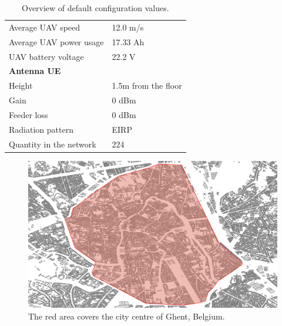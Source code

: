 \begin{table}[!htb]
\begin{tabular}[t]{m{8cm} m{7cm}}
        \hspace{3mm}  Average UAV speed                   & 12.0 m/s \\
        \hspace{3mm}  Average UAV power usage             & 17.33 Ah    \\
        \hspace{3mm}  UAV battery voltage                 & 22.2 V \\
        \hline
        \multicolumn{2}{l}{\textbf{Antenna \acs{UE}}} \\
        \hline 
        \hspace{3mm} Height                     & 1.5m from the floor       \\ 
        \hspace{3mm} Gain                      & 0 dBm   \\ 
        \hspace{3mm} Feeder loss               & 0 dBm   \\ 
        \hspace{3mm} Radiation pattern         & \acs{EIRP}  \\
        \hspace{3mm} Quantity in the network                & 224  \\
        \toprule
\end{tabular}
\caption{Overview of default configuration values.}
\label{table:defaultconf}
\end{table}

\begin{figure}[!h]
  \includegraphics[width=\textwidth]{../images/cityCenterGhent.png}
\caption{The red area covers the city centre of Ghent, Belgium.}
  \label{fig:ghent}
\end{figure}
